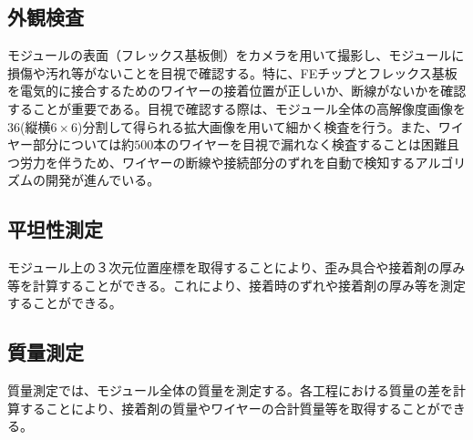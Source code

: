 \subsection{外観検査}
\label{sec:visualinsp}
モジュールの表面（フレックス基板側）をカメラを用いて撮影し、モジュールに損傷や汚れ等がないことを目視で確認する。特に、FEチップとフレックス基板を電気的に接合するためのワイヤーの接着位置が正しいか、断線がないかを確認することが重要である。目視で確認する際は、モジュール全体の高解像度画像を36(縦横$6\times6$)分割して得られる拡大画像を用いて細かく検査を行う。また、ワイヤー部分については約$500$本のワイヤーを目視で漏れなく検査することは困難且つ労力を伴うため、ワイヤーの断線や接続部分のずれを自動で検知するアルゴリズムの開発が進んでいる。



\subsection{平坦性測定}
\label{sec:metrology}
モジュール上の３次元位置座標を取得することにより、歪み具合や接着剤の厚み等を計算することができる。これにより、接着時のずれや接着剤の厚み等を測定することができる。



\subsection{質量測定}
\label{sec:mass}
質量測定では、モジュール全体の質量を測定する。各工程における質量の差を計算することにより、接着剤の質量やワイヤーの合計質量等を取得することができる。

